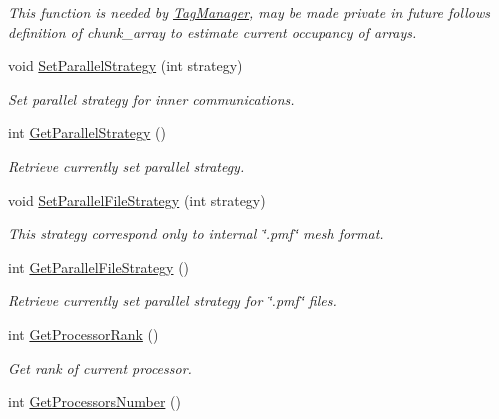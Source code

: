 \begin{DoxyCompactItemize}
\begin{DoxyCompactList}\small\item\em This function is needed by \hyperlink{classINMOST_1_1TagManager}{Tag\-Manager}, may be made private in future follows definition of chunk\-\_\-array to estimate current occupancy of arrays. \end{DoxyCompactList}\item 
void \hyperlink{classINMOST_1_1Mesh_adc92ee8e1fc34b3f3a41f2a1984ab6f2}{Set\-Parallel\-Strategy} (int strategy)
\begin{DoxyCompactList}\small\item\em Set parallel strategy for inner communications. \end{DoxyCompactList}\item 
int \hyperlink{classINMOST_1_1Mesh_a8543798618f286ce2af5ca2d5a0d7b87}{Get\-Parallel\-Strategy} ()
\begin{DoxyCompactList}\small\item\em Retrieve currently set parallel strategy. \end{DoxyCompactList}\item 
void \hyperlink{classINMOST_1_1Mesh_a2e45b137719114d78119bfe487be259f}{Set\-Parallel\-File\-Strategy} (int strategy)
\begin{DoxyCompactList}\small\item\em This strategy correspond only to internal \char`\"{}.\-pmf\char`\"{} mesh format. \end{DoxyCompactList}\item 
int \hyperlink{classINMOST_1_1Mesh_a7a8d32b876d5299b4da51de0f5f5386a}{Get\-Parallel\-File\-Strategy} ()
\begin{DoxyCompactList}\small\item\em Retrieve currently set parallel strategy for \char`\"{}.\-pmf\char`\"{} files. \end{DoxyCompactList}\item 
\hypertarget{classINMOST_1_1Mesh_a35e810a4aa1bebf48a9911304b3b5bce}{int \hyperlink{classINMOST_1_1Mesh_a35e810a4aa1bebf48a9911304b3b5bce}{Get\-Processor\-Rank} ()}\label{classINMOST_1_1Mesh_a35e810a4aa1bebf48a9911304b3b5bce}

\begin{DoxyCompactList}\small\item\em Get rank of current processor. \end{DoxyCompactList}\item 
\hypertarget{classINMOST_1_1Mesh_a7400218ed56f607396affac271954f37}{int \hyperlink{classINMOST_1_1Mesh_a7400218ed56f607396affac271954f37}{Get\-Processors\-Number} ()}\label{classINMOST_1_1Mesh_a7400218ed56f607396affac271954f37}


\end{DoxyCompactItemize}
